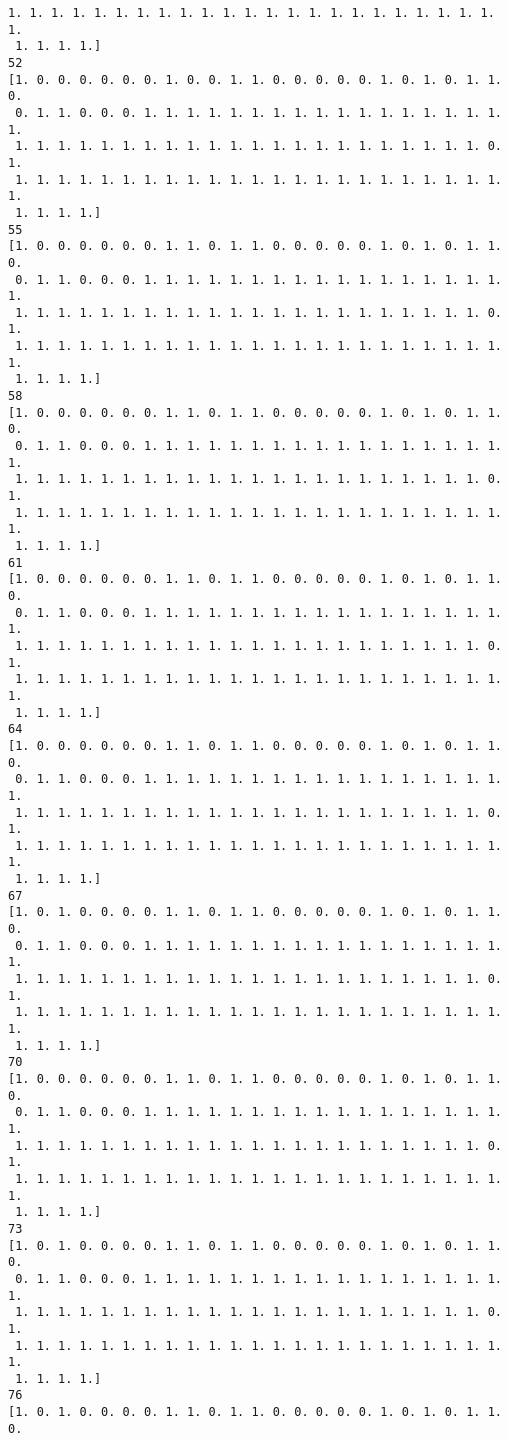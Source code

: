 \documentclass[11pt]{article}
\begin{document}
\begin{Verbatim}[commandchars=\\\{\}]
 1. 1. 1. 1. 1. 1. 1. 1. 1. 1. 1. 1. 1. 1. 1. 1. 1. 1. 1. 1. 1. 1. 1. 1.
 1. 1. 1. 1.]
52
[1. 0. 0. 0. 0. 0. 0. 1. 0. 0. 1. 1. 0. 0. 0. 0. 0. 1. 0. 1. 0. 1. 1. 0.
 0. 1. 1. 0. 0. 0. 1. 1. 1. 1. 1. 1. 1. 1. 1. 1. 1. 1. 1. 1. 1. 1. 1. 1.
 1. 1. 1. 1. 1. 1. 1. 1. 1. 1. 1. 1. 1. 1. 1. 1. 1. 1. 1. 1. 1. 1. 0. 1.
 1. 1. 1. 1. 1. 1. 1. 1. 1. 1. 1. 1. 1. 1. 1. 1. 1. 1. 1. 1. 1. 1. 1. 1.
 1. 1. 1. 1.]
55
[1. 0. 0. 0. 0. 0. 0. 1. 1. 0. 1. 1. 0. 0. 0. 0. 0. 1. 0. 1. 0. 1. 1. 0.
 0. 1. 1. 0. 0. 0. 1. 1. 1. 1. 1. 1. 1. 1. 1. 1. 1. 1. 1. 1. 1. 1. 1. 1.
 1. 1. 1. 1. 1. 1. 1. 1. 1. 1. 1. 1. 1. 1. 1. 1. 1. 1. 1. 1. 1. 1. 0. 1.
 1. 1. 1. 1. 1. 1. 1. 1. 1. 1. 1. 1. 1. 1. 1. 1. 1. 1. 1. 1. 1. 1. 1. 1.
 1. 1. 1. 1.]
58
[1. 0. 0. 0. 0. 0. 0. 1. 1. 0. 1. 1. 0. 0. 0. 0. 0. 1. 0. 1. 0. 1. 1. 0.
 0. 1. 1. 0. 0. 0. 1. 1. 1. 1. 1. 1. 1. 1. 1. 1. 1. 1. 1. 1. 1. 1. 1. 1.
 1. 1. 1. 1. 1. 1. 1. 1. 1. 1. 1. 1. 1. 1. 1. 1. 1. 1. 1. 1. 1. 1. 0. 1.
 1. 1. 1. 1. 1. 1. 1. 1. 1. 1. 1. 1. 1. 1. 1. 1. 1. 1. 1. 1. 1. 1. 1. 1.
 1. 1. 1. 1.]
61
[1. 0. 0. 0. 0. 0. 0. 1. 1. 0. 1. 1. 0. 0. 0. 0. 0. 1. 0. 1. 0. 1. 1. 0.
 0. 1. 1. 0. 0. 0. 1. 1. 1. 1. 1. 1. 1. 1. 1. 1. 1. 1. 1. 1. 1. 1. 1. 1.
 1. 1. 1. 1. 1. 1. 1. 1. 1. 1. 1. 1. 1. 1. 1. 1. 1. 1. 1. 1. 1. 1. 0. 1.
 1. 1. 1. 1. 1. 1. 1. 1. 1. 1. 1. 1. 1. 1. 1. 1. 1. 1. 1. 1. 1. 1. 1. 1.
 1. 1. 1. 1.]
64
[1. 0. 0. 0. 0. 0. 0. 1. 1. 0. 1. 1. 0. 0. 0. 0. 0. 1. 0. 1. 0. 1. 1. 0.
 0. 1. 1. 0. 0. 0. 1. 1. 1. 1. 1. 1. 1. 1. 1. 1. 1. 1. 1. 1. 1. 1. 1. 1.
 1. 1. 1. 1. 1. 1. 1. 1. 1. 1. 1. 1. 1. 1. 1. 1. 1. 1. 1. 1. 1. 1. 0. 1.
 1. 1. 1. 1. 1. 1. 1. 1. 1. 1. 1. 1. 1. 1. 1. 1. 1. 1. 1. 1. 1. 1. 1. 1.
 1. 1. 1. 1.]
67
[1. 0. 1. 0. 0. 0. 0. 1. 1. 0. 1. 1. 0. 0. 0. 0. 0. 1. 0. 1. 0. 1. 1. 0.
 0. 1. 1. 0. 0. 0. 1. 1. 1. 1. 1. 1. 1. 1. 1. 1. 1. 1. 1. 1. 1. 1. 1. 1.
 1. 1. 1. 1. 1. 1. 1. 1. 1. 1. 1. 1. 1. 1. 1. 1. 1. 1. 1. 1. 1. 1. 0. 1.
 1. 1. 1. 1. 1. 1. 1. 1. 1. 1. 1. 1. 1. 1. 1. 1. 1. 1. 1. 1. 1. 1. 1. 1.
 1. 1. 1. 1.]
70
[1. 0. 0. 0. 0. 0. 0. 1. 1. 0. 1. 1. 0. 0. 0. 0. 0. 1. 0. 1. 0. 1. 1. 0.
 0. 1. 1. 0. 0. 0. 1. 1. 1. 1. 1. 1. 1. 1. 1. 1. 1. 1. 1. 1. 1. 1. 1. 1.
 1. 1. 1. 1. 1. 1. 1. 1. 1. 1. 1. 1. 1. 1. 1. 1. 1. 1. 1. 1. 1. 1. 0. 1.
 1. 1. 1. 1. 1. 1. 1. 1. 1. 1. 1. 1. 1. 1. 1. 1. 1. 1. 1. 1. 1. 1. 1. 1.
 1. 1. 1. 1.]
73
[1. 0. 1. 0. 0. 0. 0. 1. 1. 0. 1. 1. 0. 0. 0. 0. 0. 1. 0. 1. 0. 1. 1. 0.
 0. 1. 1. 0. 0. 0. 1. 1. 1. 1. 1. 1. 1. 1. 1. 1. 1. 1. 1. 1. 1. 1. 1. 1.
 1. 1. 1. 1. 1. 1. 1. 1. 1. 1. 1. 1. 1. 1. 1. 1. 1. 1. 1. 1. 1. 1. 0. 1.
 1. 1. 1. 1. 1. 1. 1. 1. 1. 1. 1. 1. 1. 1. 1. 1. 1. 1. 1. 1. 1. 1. 1. 1.
 1. 1. 1. 1.]
76
[1. 0. 1. 0. 0. 0. 0. 1. 1. 0. 1. 1. 0. 0. 0. 0. 0. 1. 0. 1. 0. 1. 1. 0.

\end{Verbatim}
\end{document}
